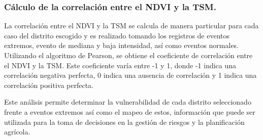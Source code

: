       \subsubsection{\textbf{Cálculo de la correlación entre el NDVI y la TSM.}}
      
      La correlación entre el NDVI y la TSM se calcula de manera particular para cada caso del distrito escogido y es realizado tomando los registros de eventos extremos, evento de mediana y baja intensidad, así como eventos normales. Utilizando el algoritmo de Pearson, se obtiene el coeficiente de correlación entre el NDVI y la TSM. Este coeficiente varía entre -1 y 1, donde -1 indica una correlación negativa perfecta, 0 indica una ausencia de correlación y 1 indica una correlación positiva perfecta. 

      Este análisis permite determinar la vulnerabilidad de cada distrito seleccionado frente a eventos extremos así como el mapeo de estos, información que puede ser utilizada para la toma de decisiones en la gestión de riesgos y la planificación agrícola.
      
      

